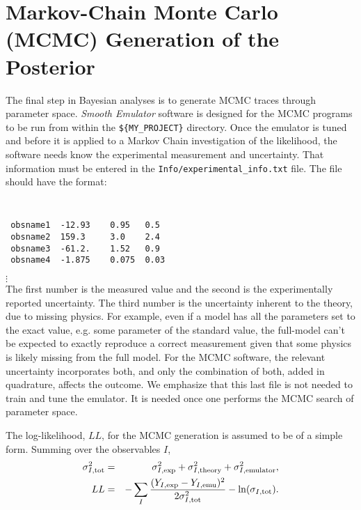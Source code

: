 \documentclass[UserManual.tex]{subfiles}
\begin{document}
\setcounter{section}{6}
\section{Markov-Chain Monte Carlo (MCMC) Generation of the Posterior}\label{sec:mcmc}

The final step in Bayesian analyses is to generate MCMC traces through parameter space. {\it Smooth Emulator} software is designed for the MCMC programs to be run from within the {\tt \$\{MY\_PROJECT\}} directory. Once the emulator is tuned and before it is applied to a Markov Chain investigation of the likelihood, the software needs know the experimental measurement and uncertainty. That information must be entered in the {\tt Info/experimental\_info.txt} file. The file should have the format:
{\tt
\begin{verbatim}
 obsname1  -12.93    0.95   0.5
 obsname2  159.3     3.0    2.4
 obsname3  -61.2.    1.52   0.9
 obsname4  -1.875    0.075  0.03
\end{verbatim}}
\vspace*{-16pt}
 \hspace*{28pt}$\vdots$\\
The first number is the measured value and the second is the experimentally reported uncertainty. The third number is the uncertainty inherent to the theory, due to missing physics. For example, even if a model has all the parameters set to the exact value, e.g. some parameter of the standard value, the full-model can't be expected to exactly reproduce a correct measurement given that some physics is likely missing from the full model. For the MCMC software, the relevant uncertainty incorporates both, and only the combination of both, added in quadrature, affects the outcome. We emphasize that this last file is not needed to train and tune the emulator. It is needed once one performs the MCMC search of parameter space.

The log-likelihood, $LL$, for the MCMC generation is assumed to be of a simple form. Summing over the observables $I$,
\begin{eqnarray*}
\sigma_{I,{\rm tot}}^{2}&=&\sigma_{I,{\rm exp}}^2+\sigma_{I,{\rm theory}}^2+\sigma_{I,{\rm emulator}}^2,\\
LL&=&-\sum_{I}\frac{(Y_{I,{\rm exp}}-Y_{I,{\rm emu}})^{2}}{2\sigma_{I,{\rm tot}}^{2}}-\ln(\sigma_{I,{\rm tot}}).
\end{eqnarray*}
\end{document}
